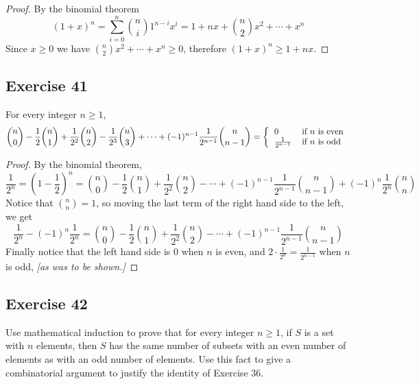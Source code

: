 \documentclass[14pt]{extarticle}
\begin{document}
\begin{proof}
By the binomial theorem
\[
(1+x)^n = \sum_{i=0}^{n} \binom{n}{i}1^{n-i}x^i = 1 + nx + \binom{n}{2}x^2 + \cdots + x^n
\]
Since \(x \geq 0\) we have \(\binom{n}{2}x^2 + \cdots + x^n \geq 0\), therefore \((1+x)^n \geq 1 + nx\).
\end{proof}

\subsection{Exercise 41}
For every integer \(n \geq 1\),
\[
\binom{n}{0} - \frac{1}{2}\binom{n}{1} + \frac{1}{2^2}\binom{n}{2} - \frac{1}{2^3}\binom{n}{3} + \cdots + (-1)^{n-1}
\frac{1}{2^{n-1}}\binom{n}{n-1} =
\left\{
\begin{tabular}{ll}
\(0\) & if \(n\) is even \\
\(\frac{1}{2^{n-1}}\) & if \(n\) is odd
\end{tabular}
\right.
\]
\begin{proof}
By the binomial theorem, 
\[
\frac{1}{2^n} = (1-\frac{1}{2})^n = \binom{n}{0}- \frac{1}{2}\binom{n}{1} + \frac{1}{2^2} \binom{n}{2} - \cdots + 
(-1)^{n-1} \frac{1}{2^{n-1}} \binom{n}{n-1} + (-1)^{n} \frac{1}{2^{n}}\binom{n}{n}
\]
Notice that \(\binom{n}{n} = 1\), so moving the last term of the right hand side to the left, we get
\[
\frac{1}{2^n} - (-1)^{n} \frac{1}{2^{n}} = \binom{n}{0}- \frac{1}{2}\binom{n}{1} + \frac{1}{2^2} \binom{n}{2} - \cdots 
+ (-1)^{n-1} \frac{1}{2^{n-1}} \binom{n}{n-1}
\]
Finally notice that the left hand side is 0 when \(n\) is even, and \(2 \cdot \frac{1}{2^n} = \frac{1}{2^{n-1}}\) when
\(n\) is odd, {\it [as was to be shown.]}
\end{proof}

\subsection{Exercise 42}
Use mathematical induction to prove that for every integer \(n \geq 1\), if \(S\) is a set with \(n\) elements, then \(S\) 
has the same number of subsets with an even number of elements as with an odd number of elements. Use this fact to give a 
combinatorial argument to justify the identity of Exercise 36.
\end{document}
